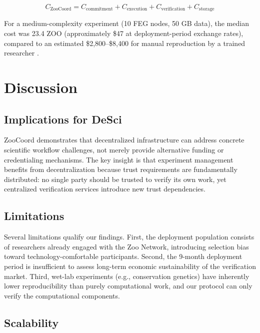 \documentclass[11pt,a4paper]{article}
\begin{document}
\begin{equation}
    C_{\text{ZooCoord}} = C_{\text{commitment}} + C_{\text{execution}} + C_{\text{verification}} + C_{\text{storage}}
\end{equation}

For a medium-complexity experiment (10 FEG nodes, 50 GB data), the median cost was 23.4 ZOO (approximately \$47 at deployment-period exchange rates), compared to an estimated \$2,800--\$8,400 for manual reproduction by a trained researcher \citep{freedman2015economics}.

\section{Discussion}
\label{sec:discussion}

\subsection{Implications for DeSci}

ZooCoord demonstrates that decentralized infrastructure can address concrete scientific workflow challenges, not merely provide alternative funding or credentialing mechanisms.
The key insight is that experiment management benefits from decentralization because trust requirements are fundamentally distributed: no single party should be trusted to verify its own work, yet centralized verification services introduce new trust dependencies.

\subsection{Limitations}

Several limitations qualify our findings.
First, the deployment population consists of researchers already engaged with the Zoo Network, introducing selection bias toward technology-comfortable participants.
Second, the 9-month deployment period is insufficient to assess long-term economic sustainability of the verification market.
Third, wet-lab experiments (e.g., conservation genetics) have inherently lower reproducibility than purely computational work, and our protocol can only verify the computational components.

\subsection{Scalability}
\end{document}
